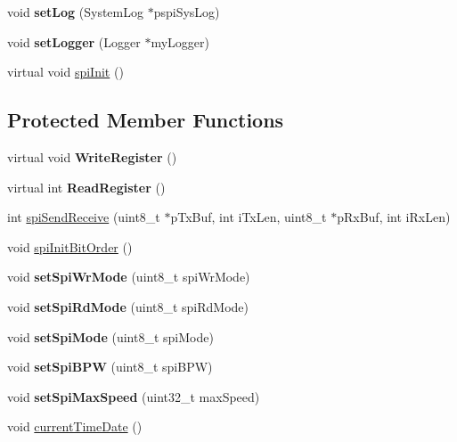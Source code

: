 \begin{DoxyCompactItemize}
\item 
\hypertarget{classspi_aa1251c2275e3a868291c85106de2f44b}{void {\bfseries set\-Log} (System\-Log $\ast$pspi\-Sys\-Log)}\label{classspi_aa1251c2275e3a868291c85106de2f44b}

\item 
\hypertarget{classspi_a868d26f2805f7a0a5ab2b45fef847a3d}{void {\bfseries set\-Logger} (Logger $\ast$my\-Logger)}\label{classspi_a868d26f2805f7a0a5ab2b45fef847a3d}

\item 
virtual void \hyperlink{classspi_af6b5a441ef9014df209fa3803d0fa68f}{spi\-Init} ()
\end{DoxyCompactItemize}
\subsection*{Protected Member Functions}
\begin{DoxyCompactItemize}
\item 
\hypertarget{classspi_a01ec3f79a14b29cee3fed591c477ecc4}{virtual void {\bfseries Write\-Register} ()}\label{classspi_a01ec3f79a14b29cee3fed591c477ecc4}

\item 
\hypertarget{classspi_ab82db7e47c0788f8593c0213688043cd}{virtual int {\bfseries Read\-Register} ()}\label{classspi_ab82db7e47c0788f8593c0213688043cd}

\item 
int \hyperlink{classspi_ace5d4b909ab9a103ae676df30db26836}{spi\-Send\-Receive} (uint8\-\_\-t $\ast$p\-Tx\-Buf, int i\-Tx\-Len, uint8\-\_\-t $\ast$p\-Rx\-Buf, int i\-Rx\-Len)
\item 
void \hyperlink{classspi_ab1569afd18aaa3ecaacc5252dab1177c}{spi\-Init\-Bit\-Order} ()
\item 
\hypertarget{classspi_a911578bfdd06fb5a4572069213072e53}{void {\bfseries set\-Spi\-Wr\-Mode} (uint8\-\_\-t spi\-Wr\-Mode)}\label{classspi_a911578bfdd06fb5a4572069213072e53}

\item 
\hypertarget{classspi_aea783dd071bb43a6cd05bc9cf4acb0d4}{void {\bfseries set\-Spi\-Rd\-Mode} (uint8\-\_\-t spi\-Rd\-Mode)}\label{classspi_aea783dd071bb43a6cd05bc9cf4acb0d4}

\item 
\hypertarget{classspi_aeb466902f0246e674230656c36260417}{void {\bfseries set\-Spi\-Mode} (uint8\-\_\-t spi\-Mode)}\label{classspi_aeb466902f0246e674230656c36260417}

\item 
\hypertarget{classspi_a0ca79e4dfeb0520519aae82576881229}{void {\bfseries set\-Spi\-B\-P\-W} (uint8\-\_\-t spi\-B\-P\-W)}\label{classspi_a0ca79e4dfeb0520519aae82576881229}

\item 
\hypertarget{classspi_a00c5efd63b774a1d50d3e69c8a49e0fa}{void {\bfseries set\-Spi\-Max\-Speed} (uint32\-\_\-t max\-Speed)}\label{classspi_a00c5efd63b774a1d50d3e69c8a49e0fa}

\item 
void \hyperlink{classspi_a71d243d92efaea106a3ee14970ea5ebe}{current\-Time\-Date} ()
\end{DoxyCompactItemize}
